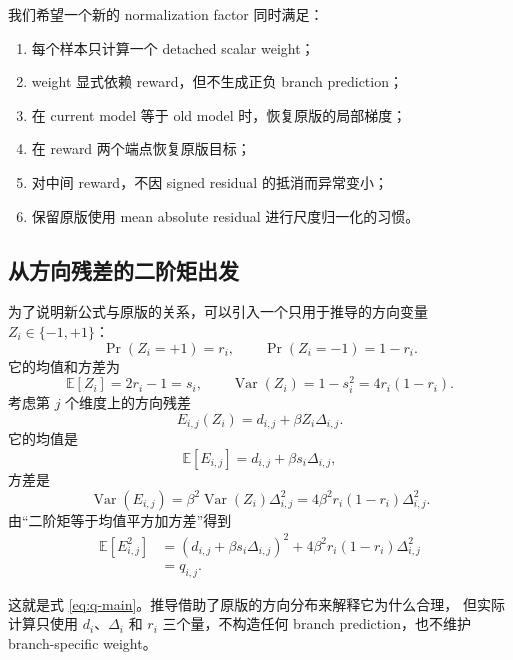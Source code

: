 \documentclass[11pt,a4paper]{article}
\begin{document}
我们希望一个新的 normalization factor 同时满足：
\begin{enumerate}
  \item 每个样本只计算一个 detached scalar weight；
  \item weight 显式依赖 reward，但不生成正负 branch prediction；
  \item 在 current model 等于 old model 时，恢复原版的局部梯度；
  \item 在 reward 两个端点恢复原版目标；
  \item 对中间 reward，不因 signed residual 的抵消而异常变小；
  \item 保留原版使用 mean absolute residual 进行尺度归一化的习惯。
\end{enumerate}

\subsection{从方向残差的二阶矩出发}

为了说明新公式与原版的关系，可以引入一个只用于推导的方向变量
$Z_i\in\{-1,+1\}$：
\begin{equation}
\Pr(Z_i=+1)=r_i,
\qquad
\Pr(Z_i=-1)=1-r_i.
\end{equation}
它的均值和方差为
\begin{equation}
\mathbb{E}[Z_i]=2r_i-1=s_i,
\qquad
\operatorname{Var}(Z_i)=1-s_i^2=4r_i(1-r_i).
\end{equation}
考虑第 $j$ 个维度上的方向残差
\begin{equation}
E_{i,j}(Z_i)=d_{i,j}+\beta Z_i\Delta_{i,j}.
\end{equation}
它的均值是
\begin{equation}
\mathbb{E}[E_{i,j}]
=
d_{i,j}+\beta s_i\Delta_{i,j},
\end{equation}
方差是
\begin{equation}
\operatorname{Var}(E_{i,j})
=
\beta^2\operatorname{Var}(Z_i)\Delta_{i,j}^2
=
4\beta^2r_i(1-r_i)\Delta_{i,j}^2.
\end{equation}
由“二阶矩等于均值平方加方差”得到
\begin{align}
\mathbb{E}\!\left[E_{i,j}^2\right]
&=
\left(
d_{i,j}+\beta s_i\Delta_{i,j}
\right)^2
+
4\beta^2r_i(1-r_i)\Delta_{i,j}^2
\\
&=q_{i,j}.
\end{align}

这就是式 \eqref{eq:q-main}。推导借助了原版的方向分布来解释它为什么合理，
但实际计算只使用 $d_i$、$\Delta_i$ 和 $r_i$ 三个量，不构造任何 branch
prediction，也不维护 branch-specific weight。
\end{document}
